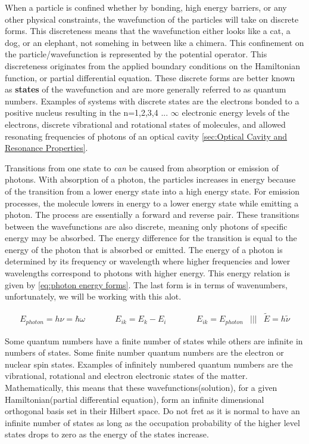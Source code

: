 \documentclass[11pt,a4paper]{book}
\begin{document}
	When a particle is confined whether by bonding, high energy barriers, or any other physical constraints, the wavefunction of the particles will take on discrete forms. This discreteness means that the wavefunction either looks like a cat, a dog, or an elephant, not somehing in between like a chimera. This confinement on the particle/wavefunction is represented by the potential operator. This discreteness originates from the applied boundary conditions on the Hamiltonian function, or partial differential equation. These discrete forms are better known as {\bfseries states} of the wavefunction and are more generally referred to as quantum numbers. Examples of systems with discrete states are the electrons bonded to a positive nucleus resulting in the n=1,2,3,4 ... $\infty$ electronic energy levels of the electrons, discrete vibrational and rotational states of molecules, and allowed resonating frequencies of photons of an optical cavity \autoref{sec:Optical Cavity and Resonance Properties}.
	\
	
	Transitions from one state to \textit{can} be caused from absorption or emission of photons. With absorption of a photon, the particles increases in energy because of the transition from a lower energy state into a high energy state. For emission processes, the molecule lowers in energy to a lower energy state while emitting a photon. The process are essentially a forward and reverse pair. These transitions between the wavefunctions are also discrete, meaning only photons of specific energy may be absorbed. The energy difference for the transition is equal to the energy of the photon that is absorbed or emitted. The energy of a photon is determined by its frequency or wavelength where higher frequencies and lower wavelengths correspond to photons with higher energy. This energy relation is given by \autoref{eq:photon energy forms}. The last form is in terms of wavenumbers, unfortunately, we will be working with this alot.
	
	\begin{equation}
		\label{eq:photon energy forms}
		\begin{array}{cccccccc}
		E_{photon}=h\nu=\hbar \omega &\qquad &E_{ik}=E_{k}-E_{i}  & \qquad & E_{ik} = E_{photon}& ||| &\tilde{E}=h\tilde{\nu}
		\end{array}
	\end{equation} 
	
	Some quantum numbers have a finite number of states while others are infinite in numbers of states. Some finite number quantum numbers are the electron or nuclear spin states. Examples of infinitely numbered quantum numbers are the vibrational, rotational and electron electronic states of the matter. Mathematically, this means that these wavefunctions(solution), for a given Hamiltonian(partial differential equation), form an infinite dimensional orthogonal basis set in their Hilbert space. Do not fret as it is normal to have an infinite number of states as long as the occupation probability of the higher level states drops to zero as the energy of the states increase. 
	
\end{document}
